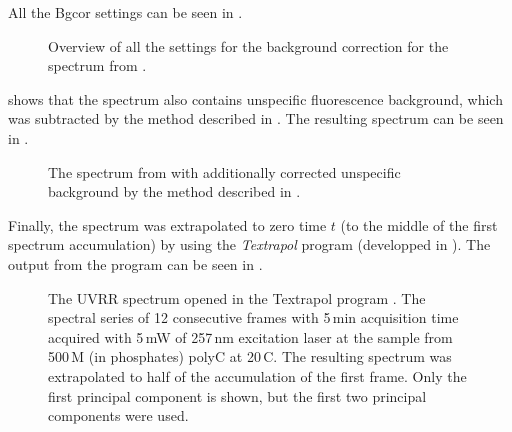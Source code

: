 All the Bgcor settings can be seen in
.

\begin{figure}
	\centering
	\caption[%
		Bgcor -- settings.
	]{%
		Overview of all the settings for the background correction for the spectrum
		from
		.
	}
	\label{\figlabel{background:bgcor_settings}}
\end{figure}

 shows that the spectrum also contains unspecific
fluorescence background, which was subtracted by the method described in
\textcite{Palacky2011}.
The resulting spectrum can be seen in
.

\begin{figure}
	\centering
	
	\vspace{3mm}
	\caption[%
		Single frame with a corrected background.
	]{%
		The spectrum from
		with additionally corrected unspecific background by the method described
		in
		\textcite{Palacky2011}.
	}
	\label{\figlabel{background:corrected_frame}}
\end{figure}

Finally, the spectrum was extrapolated to zero time $t$ (to the middle of the
first spectrum accumulation) by using the \emph{Textrapol} program
\parencite{Textrapol2017} (developped in \cite{Matlab}).
The output from the program can be seen in
.

\begin{figure}
	\centering
	\caption[%
		Textrapol -- program for extrapolation and interpolation of series of
		spectra using PCA.
	]{%
		The UVRR spectrum opened in the Textrapol program
		\parencite{Textrapol2017}.
		The spectral series of 12 consecutive frames with 5\,min acquisition time
		acquired with 5\,mW of 257\,nm excitation laser at the sample
		from 500\,M (in phosphates) polyC at 20\,\textdegree{}C.
		The resulting spectrum was extrapolated to half of the accumulation of
		the first frame. Only the first principal component is shown, but the first
		two principal components were used.
	}
	\label{\figlabel{background:textrapol}}
\end{figure}
